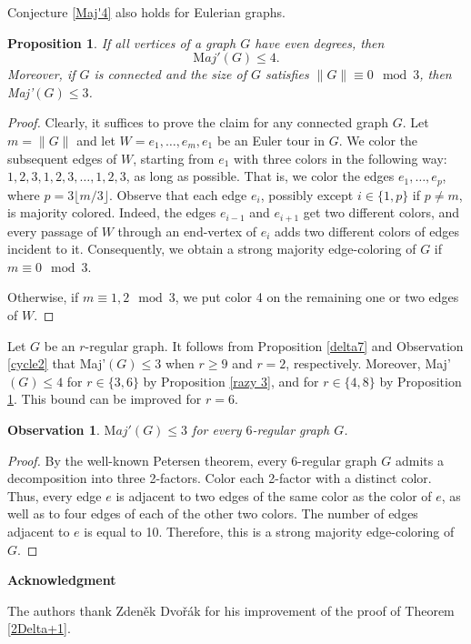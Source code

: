 \documentclass[11pt]{article}
\newtheorem{proposition}[theorem]{Proposition}
\newtheorem{observation}[theorem]{Observation}
\begin{document}
\vspace{3mm} 
Conjecture \ref{Maj'4} also holds for Eulerian graphs. 
\begin{proposition}\label{Euler}
If all vertices of a graph $G$ have even degrees, then $${\mathrm Maj'}(G)\le 4.$$    
Moreover, if $G$ is connected and the size of $G$ satisfies $\|G\|\equiv 0\mod 3$, then Maj'$(G)\le 3$.
\end{proposition}
\begin{proof}
Clearly, it suffices to prove the claim for any connected graph $G$. Let $m=\|G\|$ and let $W=e_1,\ldots,e_m,e_1$ be an Euler tour in $G$. We color the subsequent edges of $W$, starting from $e_1$ with three colors in the following way: $1,2,3,1,2,3,\ldots,1,2,3$, as long as possible. That is, we color the edges $e_1,\ldots,e_p$, where $p=3\lfloor m/3\rfloor$. 
Observe that each edge $e_i$, possibly except $i\in\{1,p\}$ if $p\ne m$, is majority colored. Indeed, the edges $e_{i-1}$ and $e_{i+1}$ get two different colors, and every passage of $W$ through an end-vertex of $e_i$ adds two different colors of edges incident to it. Consequently, we obtain a strong majority edge-coloring of $G$ if $m\equiv 0\mod 3$. 

Otherwise, if $m\equiv 1,2\mod 3$, we put color 4 on the remaining one or two edges of $W$. 
\end{proof}
\vspace{3mm}

 Let $G$ be an $r$-regular graph. It follows from Proposition \ref{delta7} and Observation \ref{cycle2} that Maj'$(G)\le 3$ when $r\ge 9$ and $r=2$, respectively. Moreover, Maj'$(G)\le 4$ for $r\in\{3,6\}$ by Proposition \ref{razy 3}, and for $r\in\{4,8\}$ by Proposition \ref{Euler}. This bound can be improved for $r=6$.
\begin{observation}\label{6r}
${\mathrm Maj}'(G)\le 3$ for every $6$-regular graph $G$.
\end{observation}
\begin{proof}
By the well-known Petersen theorem, every 6-regular graph $G$  admits a decomposition into three 2-factors. Color each 2-factor with a distinct color. Thus, every edge $e$ is adjacent to two edges of the same color as the color of $e$, as well as to four edges of each of the other two colors. The number of edges adjacent to $e$ is equal to 10. Therefore, this is a strong majority edge-coloring of $G$.   
\end{proof}

\vspace{4mm}
\noindent
{\bf Acknowledgment}
\vspace{2mm}

\noindent
The authors thank Zden\v ek Dvo\v r\'ak for his improvement of the proof of Theorem \ref{2Delta+1}.



 

\end{document}
